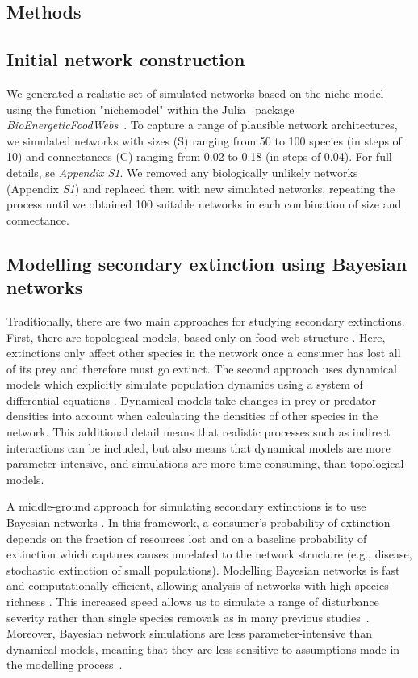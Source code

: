 \documentclass[12pt]{article}
\begin{document}
\begin{spacing}{2.0}
\section*{Methods}

	\subsection*{Initial network construction}

		We generated a realistic set of simulated networks based on the niche model~\citep{Williams2000,Stouffer2007} using the function "nichemodel" within the Julia~\citep{Bezanson2017julia} package \emph{BioEnergeticFoodWebs}~\citep{bioenergfw}. 
		To capture a range of plausible network architectures, we simulated networks with sizes (S) ranging from 50 to 100 species (in steps of 10) and connectances (C) ranging from 0.02 to 0.18 (in steps of 0.04). 
		For full details, se \emph{Appendix S1}.
		We removed any biologically unlikely networks (Appendix \emph{S1}) and replaced them with new simulated networks, repeating the process until we obtained 100 suitable networks in each combination of size and connectance.


    \subsection*{Modelling secondary extinction using Bayesian networks}

    Traditionally, there are two main approaches for studying secondary extinctions. First, there are topological models, based only on food web structure \citep{dunne2009cascading}. Here, extinctions only affect other species in the network once a consumer has lost all of its prey and therefore must go extinct. 
    The second approach uses dynamical models which explicitly simulate population dynamics using a system of differential equations \citep{binzer2011susceptibility}. Dynamical models take changes in prey or predator densities into account when calculating the densities of other species in the network. 
    This additional detail means that realistic processes such as indirect interactions can be included, but also means that dynamical models are more parameter intensive, and simulations are more time-consuming, than topological models. 
    
    
    A middle‐ground approach for simulating secondary extinctions is to use Bayesian networks \citep{Eklof2013}. 
    In this framework, a consumer's probability of extinction depends on the fraction of resources lost and on a baseline probability of extinction which captures causes unrelated to the network structure (e.g., disease, stochastic extinction of small populations).
    Modelling Bayesian networks is fast and computationally efficient, allowing analysis of networks with high species richness \citep{Haussler2020}. 
    This increased speed allows us to simulate a range of disturbance severity rather than single species removals as in many previous studies~\citep{}.
    Moreover, Bayesian network simulations are less parameter-intensive than dynamical models, meaning that they are less sensitive to assumptions made in the modelling process~\citep{}.
    

\end{spacing}
\end{document}
